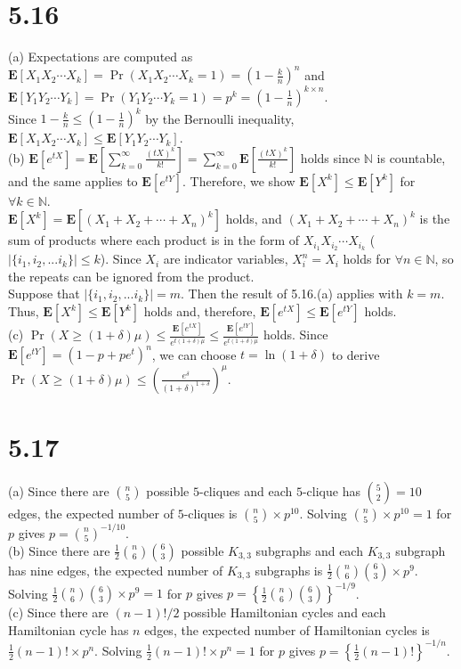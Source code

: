 \documentclass{article}
\begin{document}
\section*{5.16}
(a) Expectations are computed as $\textbf{E}[X_1X_2\cdots X_k]=\Pr(X_1X_2\cdots X_k=1)=(1-\frac{k}{n})^n$ 
and $\textbf{E}[Y_1Y_2\cdots Y_k]=\Pr(Y_1Y_2\cdots Y_k=1)=p^k=(1-\frac{1}{n})^{k\times n}$.\\
Since $1-\frac{k}{n}\leq (1-\frac{1}{n})^k$ by the Bernoulli inequality, $\textbf{E}[X_1X_2\cdots X_k]\leq \textbf{E}[Y_1Y_2\cdots Y_k]$.\\
(b) $\textbf{E}[e^{tX}]=\textbf{E}\left[\sum\limits_{k=0}^\infty\frac{(tX)^k}{k!}\right]=\sum\limits_{k=0}^\infty\textbf{E}[\frac{(tX)^k}{k!}]$
holds since $\mathbb{N}$ is countable, and the same applies to $\textbf{E}[e^{tY}]$.
Therefore, we show $\textbf{E}[X^k]\leq\textbf{E}[Y^k]$ for $\forall k\in \mathbb{N}$.\\
$\textbf{E}[X^k]=\textbf{E}[(X_1+X_2+\cdots+X_n)^k]$ holds, and $(X_1+X_2+\cdots+X_n)^k$ is the sum of products where each product is in the form of $X_{i_1}X_{i_2}\cdots X_{i_k}$ ($|\{i_1,i_2,...i_k\}|\leq k$).
Since $X_i$ are indicator variables, $X_i^n=X_i$ holds for $\forall n \in \mathbb{N}$, so the repeats can be ignored from the product.\\
Suppose that $|\{i_1,i_2,...i_k\}|=m$. Then the result of 5.16.(a) applies with $k=m$. Thus, $\textbf{E}[X^k]\leq\textbf{E}[Y^k]$ holds and, therefore, $\textbf{E}[e^{tX}]\leq\textbf{E}[e^{tY}]$ holds.\\
(c) $\Pr(X\geq(1+\delta)\mu)\leq\frac{\textbf{E}[e^{tX}]}{e^{t(1+\delta)\mu}}\leq\frac{\textbf{E}[e^{tY}]}{e^{t(1+\delta)\mu}}$ holds. 
Since $\textbf{E}[e^{tY}]=(1-p+pe^t)^n$, we can choose $t=\ln(1+\delta)$ to derive $\Pr(X\geq(1+\delta)\mu)\leq\left(\frac{e^\delta}{(1+\delta)^{1+\delta}}\right)^\mu$.
\section*{5.17}
(a) Since there are $\binom{n}{5}$ possible $5$-cliques and each $5$-clique has $\binom{5}{2}=10$ edges, the expected number of $5$-cliques is $\binom{n}{5}\times p^{10}$.
Solving $\binom{n}{5}\times p^{10}=1$ for $p$ gives $p=\binom{n}{5}^{-1/10}$.\\
(b) Since there are $\frac{1}{2}\binom{n}{6}\binom{6}{3}$ possible $K_{3,3}$ subgraphs and each $K_{3,3}$ subgraph has nine edges,
the expected number of $K_{3,3}$ subgraphs is $\frac{1}{2}\binom{n}{6}\binom{6}{3}\times p^9$.
Solving $\frac{1}{2}\binom{n}{6}\binom{6}{3}\times p^9=1$ for $p$ gives $p=\left\{\frac{1}{2}\binom{n}{6}\binom{6}{3}\right\}^{-1/9}$.\\
(c) Since there are $(n-1)!/2$ possible Hamiltonian cycles and each Hamiltonian cycle has $n$ edges,
the expected number of Hamiltonian cycles is $\frac{1}{2}(n-1)!\times p^n$.
Solving $\frac{1}{2}(n-1)!\times p^n=1$ for $p$ gives $p=\left\{\frac{1}{2}(n-1)!\right\}^{-1/n}$.
\end{document}
